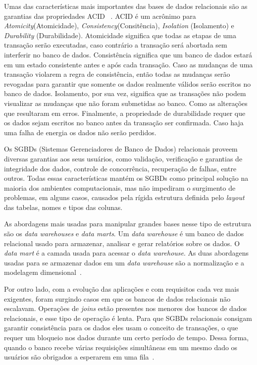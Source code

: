 Umas das características mais importantes das bases de dados relacionais são as garantias das propriedades ACID  ~\cite{Orendanalysisand}. ACID é um acrônimo para \textit{Atomicity}(Atomicidade), \textit{Consistency}(Consitência), \textit{Isolation} (Isolamento) e \textit{Durability} (Durabilidade).
Atomicidade significa que todas as etapas de uma transação serão executadas, caso contrário a transação será abortada sem interferir no banco de dados. Consistência significa que um banco de dados estará em um estado consistente antes e após cada transação. Caso as mudanças de uma transação violarem a regra de consistência, então todas as mudanças serão revogadas para garantir que somente os dados realmente válidos serão escritos no banco de dados. Isolamento, por sua vez, significa que as transações não podem visualizar as mudanças que não foram submetidas ao banco. Como as alterações que resultaram em erros. Finalmente, a propriedade de durabilidade requer que os dados sejam escritos no banco antes da transação ser confirmada. Caso haja uma falha de energia os dados não serão perdidos.

Os SGBDs (Sistemas Gerenciadores de Banco de Dados) relacionais proveem diversas garantias aos seus usuários, como validação, verificação e garantias de integridade dos dados, controle de concorrência, recuperação de falhas,  entre outros. Todas essas características mantém os SGBDs como principal solução na maioria dos ambientes computacionais, mas não impediram o surgimento de problemas, em alguns casos, causados pela rígida estrutura definida pelo \textit{layout} das tabelas, nomes e tipos das colunas.

As abordagens mais usadas para manipular grandes bases nesse tipo de estrutura são os \textit{data warehouses} e \textit{data marts}. Um \textit{data warehouse} é um banco de dados relacional usado para armazenar, analisar e gerar relatórios sobre os dados. O \textit{data mart} é a camada usada para acessar o \textit{data warehouse}. As duas abordagens usadas para se armazenar dados em um \textit{data warehouse} são a normalização e a modelagem dimensional~\cite{bigdataarchitectureandapproach}.

Por outro lado, com a evolução das aplicações e com requisitos cada vez mais exigentes, foram surgindo casos em que os bancos de dados relacionais não escalavam. Operações de \textit{joins} estão presentes nos menores dos bancos de dados relacionais, e esse tipo de operação é lenta. Para que SGBDs relacionais consigam garantir consistência para os dados eles usam o conceito de transações, o que requer um bloqueio nos dados durante um certo período de tempo.  Dessa forma, quando o banco recebe várias requisições simultâneas em um mesmo dado os usuários são obrigados a esperarem em uma fila~\cite{cassandraguide}.

